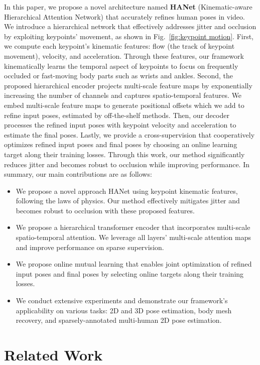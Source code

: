\documentclass[10pt,twocolumn,letterpaper]{article}
\begin{document}
In this paper, we propose a novel architecture named \textbf{HANet} (Kinematic-aware Hierarchical Attention Network) that accurately refines human poses in video. We introduce a hierarchical network that effectively addresses jitter and occlusion by exploiting keypoints' movement, as shown in Fig.~\ref{fig:keypoint motion}. First, we compute each keypoint's kinematic features: flow (the track of keypoint movement), velocity, and acceleration. Through these features, our framework kinematically learns the temporal aspect of keypoints to focus on frequently occluded or fast-moving body parts such as wrists and ankles. Second, the proposed hierarchical encoder projects multi-scale feature maps by exponentially increasing the number of channels and captures spatio-temporal features. We embed multi-scale feature maps to generate positional offsets which we add to refine input poses, estimated by off-the-shelf methods. Then, our decoder processes the refined input poses with keypoint velocity and acceleration to estimate the final poses. Lastly, we provide a cross-supervision that cooperatively optimizes refined input poses and final poses by choosing an online learning target along their training losses. Through this work, our method significantly reduces jitter and becomes robust to occlusion while improving performance. In summary, our main contributions are as follows:
\begin{itemize}
    \item We propose a novel approach HANet using keypoint kinematic features, following the laws of physics. Our method effectively mitigates jitter and becomes robust to occlusion with these proposed features. 
    \item We propose a hierarchical transformer encoder that incorporates multi-scale spatio-temporal attention. We leverage all layers' multi-scale attention maps and improve performance on sparse supervision.
    \item We propose online mutual learning that enables joint optimization of refined input poses and final poses by selecting online targets along their training losses. 
    \item We conduct extensive experiments and demonstrate our framework's applicability on various tasks: 2D and 3D pose estimation, body mesh recovery, and sparsely-annotated multi-human 2D pose estimation.
\end{itemize} \section{Related Work}
\end{document}

